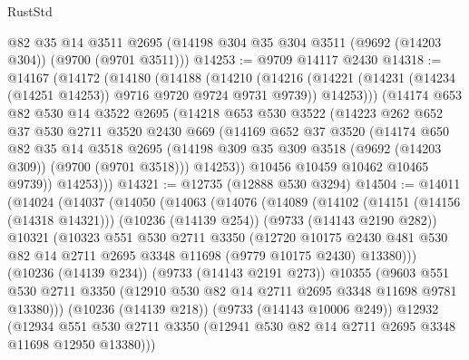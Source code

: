 \begin{lexlean}{RustStd}
\begin{coremodule}
{\begin{coremodule}
{{{{{{{{{{{{{{{{{{{{{{{{{{{{{{{{{{{{{{{{{{{{{{{{{{{{{{{    @82
    @35
    @14
    @3511
    @2695
    (@14198 @304 @35 @304 @3511 (@9692 (@14203 @304)) (@9700 (@9701 @3511)))
@14253 := @9709 @14117 @2430
@14318 := @14167
    (@14172
      (@14180
        (@14188
          (@14210
            (@14216
              (@14221 (@14231 (@14234 (@14251 @14253)) @9716 @9720 @9724 @9731 @9739))
              @14253)))
        (@14174
          @653
          @82
          @530
          @14
          @3522
          @2695
          (@14218
            @653
            @530
            @3522
            (@14223
              @262
              @652
              @37
              @530
              @2711
              @3520
              @2430
              @669
              (@14169
                @652
                @37
                @3520
                (@14174
                  @650
                  @82
                  @35
                  @14
                  @3518
                  @2695
                  (@14198 @309 @35 @309 @3518 (@9692 (@14203 @309)) (@9700 (@9701 @3518)))
                  @14253))
              @10456
              @10459
              @10462
              @10465
              @9739))
          @14253)))
@14321 := @12735 (@12888 @530 @3294)
@14504 := @14011
    (@14024
      (@14037
        (@14050
          (@14063
            (@14076
              (@14089
                (@14102
                  (@14151 (@14156 (@14318 @14321)))
                  (@10236 (@14139 @254))
                  (@9733 (@14143 @2190 @282))
                  @10321
                  (@10323
                    @551
                    @530
                    @2711
                    @3350
                    (@12720
                      @10175
                      @2430
                      @481
                      @530
                      @82
                      @14
                      @2711
                      @2695
                      @3348
                      @11698
                      (@9779 @10175 @2430)
                      @13380)))
                (@10236 (@14139 @234))
                (@9733 (@14143 @2191 @273))
                @10355
                (@9603
                  @551
                  @530
                  @2711
                  @3350
                  (@12910 @530 @82 @14 @2711 @2695 @3348 @11698 @9781 @13380)))
              (@10236 (@14139 @218))
              (@9733 (@14143 @10006 @249))
              @12932
              (@12934
                @551
                @530
                @2711
                @3350
                (@12941 @530 @82 @14 @2711 @2695 @3348 @11698 @12950 @13380)))
}}}}}}}}}}}}}}}}}}}}}}}}}}}}}}}}}}}}}}}}}}}}}}}}}}}}}}}
\end{coremodule}}
\end{coremodule}
\end{lexlean}
